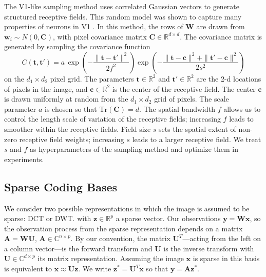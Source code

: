 \documentclass{article}
\newcommand{\todo}[1]{\textcolor{red}{[#1]}}
\renewcommand{\vec}{\mathbf}
\newcommand{\mat}{\mathbf}
\begin{document}
The V1-like sampling method uses correlated Gaussian vectors to generate structured receptive fields.
This random model was shown to capture many properties of neurons in V1 \cite{pandeyStructuredRandomReceptive}.
In this method, the rows of $\mat W$ are drawn from
$  \vec w_i \sim N(0, \mat C) $,
with pixel covariance matrix $\mat C \in \mathbb{R}^{d \times d}$.
The covariance matrix is generated by sampling the covariance function
\begin{equation}
  C(\vec t, \vec {t'}) =
  a \,
  \exp \left(-\frac{\|\vec t-\vec t'\|^2}{2f^2} \right)
  \exp \left( -\frac{\|\vec t - \vec c\|^2 + \|\vec t' - \vec c\|^2}{2s^2} \right)
  \label{eq:v1_covariance}
\end{equation}
on the $d_1 \times d_2$ pixel grid.
The parameters
$\vec t \in \mathbb{R}^2$ and
$\vec t' \in \mathbb{R}^2$ are the 2-d locations of pixels in the image, and
$\vec c \in \mathbb{R}^2$ is the center of the receptive field.
The center $\vec c$ is drawn uniformly at random from the $d_1 \times d_2$ grid of pixels.
The scale parameter $a$ is chosen so that $\mathrm{Tr}(\mat C) = d$.
The spatial bandwidth $f$ allows us to control the length scale of variation of the receptive fields; increasing $f$ leads to smoother within the receptive fields.
Field size $s$ sets the spatial extent of non-zero receptive field weights; increasing $s$ leads to a larger receptive field.
We treat $s$ and $f$ as hyperparameters of the sampling method and optimize them in experiments.


\subsection{Sparse Coding Bases}

We consider two possible representations in which the image is assumed to be sparse: DCT or DWT.
with $\vec z \in \mathbb{R}^p$ a sparse vector.
Our observations $\vec y = \mat W \vec x$, so the observation process from the sparse representation depends on a matrix
$\mat A = \mat W \mat U$, $\mat A \in \mathbb{C}^{n \times p}$.
By our convention, the matrix $\mat U^T$---acting from the left on a column vector---is the forward transform and $\mat U$ is the inverse transform with $\mat U \in \mathbb{C}^{d \times p}$ its matrix representation.
Assuming the image $\vec x$ is sparse in this basis is equivalent to
$\vec x \approx \mat U \vec z$.
We write $\vec z^* = \mat U^T \vec x$ so that $\vec y = \mat A \vec z^*$.
\end{document}

